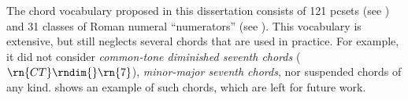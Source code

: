 
The chord vocabulary proposed in this dissertation consists
of 121 \gls{pcset}s (see
) and 31 classes of
Roman numeral ``numerators'' (see
). This
vocabulary is extensive, but still neglects several chords
that are used in practice. For example, it did not consider
\emph{common-tone diminished seventh chords}
($\rn{CT}\rndim{}\rn{7}$), \emph{minor-major seventh
chords}, nor suspended chords of any kind.
 shows an example of such
chords, which are left for future work.

